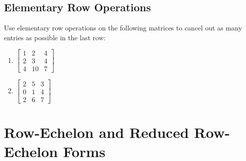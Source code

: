 \documentclass[11pt]{exam}
\begin{document}
        \subsection{Elementary Row Operations}
        \begin{questions}
            \item Use elementary row operations on the following matrices to cancel out as many entries as possible in the last row:
            \begin{enumerate}
                \item $\begin{bmatrix}
                    1 & 2 & 4 \\
                    2 & 3 & 4 \\
                    4 & 10 & 7
                \end{bmatrix}$
                \item $\begin{bmatrix}
                    2 & 5 & 3 \\
                    0 & 1 & 4 \\
                    2 & 6 & 7
                \end{bmatrix}$
            \end{enumerate}
        \end{questions}

\pagebreak
\section{Row-Echelon and Reduced Row-Echelon Forms}

    \vspace{20px}
\end{document}
